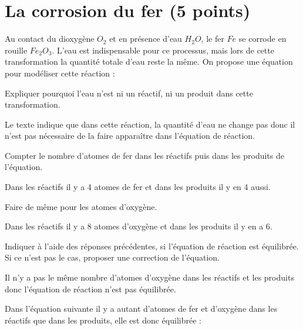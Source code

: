 
\section{La corrosion du fer (5 points)}

Au contact du dioxygène $O_2$ et en présence d'eau $H_2O$, le fer $Fe$ se corrode en rouille $Fe_2O_3$. L'eau est indispensable pour ce processus, mais lors de cette transformation la quantité totale d'eau reste la même. On propose une équation pour modéliser cette réaction : 

\begin{center}
\end{center}


\begin{questions}
	\question[1] Expliquer pourquoi l'eau n'est ni un réactif, ni un produit dans cette transformation.
	\fillwithdottedlines{2cm}
	\begin{solution}
		Le texte indique que dans cette réaction, la quantité d'eau ne change pas donc il n'est pas nécessaire de la faire apparaître dans l'équation de réaction.
	\end{solution}
	
	\question[1] Compter le nombre d'atomes de fer dans les réactifs puis dans les produits de l'équation.
	\fillwithdottedlines{2cm}
	\begin{solution}
		Dans les réactifs il y a 4 atomes de fer et dans les produits il y en 4 aussi.
	\end{solution}
	
	\question[1] Faire de même pour les atomes d'oxygène.
	\fillwithdottedlines{2cm}
	\begin{solution}
		Dans les réactifs il y a 8 atomes d'oxygène et dans les produits il y en a 6.
	\end{solution}
	
	\question[2] Indiquer à l'aide des réponses précédentes, si l'équation de réaction est équilibrée. Si ce n'est pas le cas, proposer une correction de l'équation.
	\fillwithdottedlines{3cm}
	\begin{solution}
		Il n'y a pas le même nombre d'atomes d'oxygène dans les réactifs et les produits donc l'équation de réaction n'est pas équilibrée. 
		
		Dans l'équation suivante il y a autant d'atomes de fer et d'oxygène dans les réactifs que dans les produits, elle est donc équilibrée :
		\begin{center}
		\end{center}
	\end{solution}
\end{questions}
